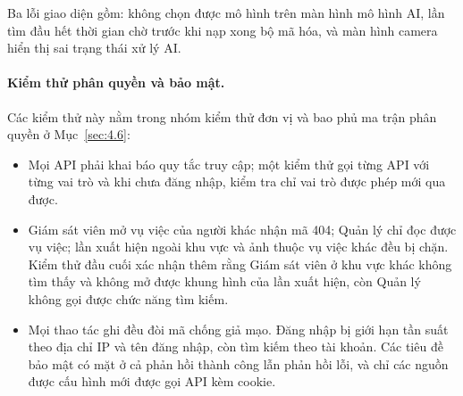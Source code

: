 Ba lỗi giao diện gồm: không chọn được mô hình trên màn hình mô hình AI, lần tìm đầu hết thời gian chờ trước khi nạp xong bộ mã hóa, và màn hình camera hiển thị sai trạng thái xử lý AI.

\paragraph{Kiểm thử phân quyền và bảo mật.} Các kiểm thử này nằm trong nhóm kiểm thử đơn vị và bao phủ ma trận phân quyền ở Mục~\ref{sec:4.6}:
\begin{itemize}
    \item Mọi API phải khai báo quy tắc truy cập; một kiểm thử gọi từng API với từng vai trò và khi chưa đăng nhập, kiểm tra chỉ vai trò được phép mới qua được.
    \item Giám sát viên mở vụ việc của người khác nhận mã 404; Quản lý chỉ đọc được vụ việc; lần xuất hiện ngoài khu vực và ảnh thuộc vụ việc khác đều bị chặn. Kiểm thử đầu cuối xác nhận thêm rằng Giám sát viên ở khu vực khác không tìm thấy và không mở được khung hình của lần xuất hiện, còn Quản lý không gọi được chức năng tìm kiếm.
    \item Mọi thao tác ghi đều đòi mã chống giả mạo. Đăng nhập bị giới hạn tần suất theo địa chỉ IP và tên đăng nhập, còn tìm kiếm theo tài khoản. Các tiêu đề bảo mật có mặt ở cả phản hồi thành công lẫn phản hồi lỗi, và chỉ các nguồn được cấu hình mới được gọi API kèm cookie.
\end{itemize}

